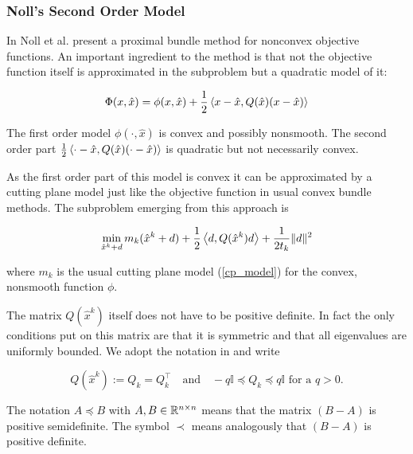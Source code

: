 
\subsubsection{Noll's Second Order Model}

In \cite{Noll2012} Noll et al. present a proximal bundle method for nonconvex objective functions. An important ingredient to the method is that not the objective function itself is approximated in the subproblem but a quadratic model of it:

\begin{equation}
	\Phi(x,\hat{x}) = \phi(x,\hat{x})+\frac{1}{2}\left\langle x-\hat{x},Q(\hat{x})(x-\hat{x})\right\rangle
\end{equation}

The first order model \(\phi(\cdot,\hat{x})\) is convex and possibly nonsmooth. The second order part \(\frac{1}{2}\left\langle \cdot-\hat{x},Q(\hat{x})(\cdot-\hat{x})\right\rangle\) is quadratic but not necessarily convex.

As the first order part of this model is convex it can be approximated by a cutting plane model just like the objective function in usual convex bundle methods. The subproblem emerging from this approach is

\begin{equation*}
	\min_{\hat{x}^k+d} m_k(\hat{x}^k+d)+\frac{1}{2}\left\langle d,Q(\hat{x}^k)d \right\rangle + \frac{1}{2t_k}\|d\|^2
\label{sub_prob_Noll}
\end{equation*} 

where \(m_k\) is the usual cutting plane model (\ref{cp_model}) for the convex, nonsmooth function \(\phi\).

The matrix \(Q(\hat{x}^k)\) itself does not have to be positive definite. In fact the only conditions put on this matrix are that it is symmetric and that all eigenvalues are uniformly bounded.
We adopt the notation in \cite{Noll2013} and write

\begin{equation*}
		Q(\hat{x}^k):=Q_k = Q_k^{\top} \quad \text{and} \quad -q\mathbb{I} \preccurlyeq Q_k \preccurlyeq q\mathbb{I} \text{ for a } q  > 0.
\end{equation*}

The notation \( A \preccurlyeq B\) with \(A, B \in \mathbb{R}^{n\times n}\) means that the matrix \((B-A)\) is positive semidefinite. The symbol \(\prec\)  means analogously that \((B-A)\) is positive definite.

